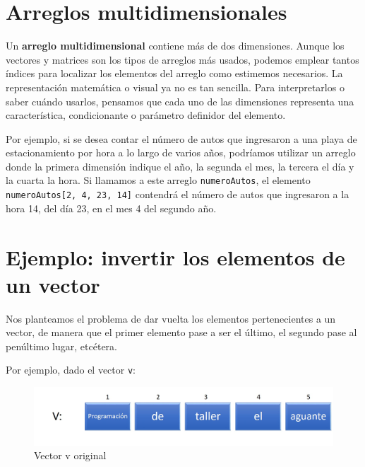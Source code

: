 \documentclass[
]{book}
\begin{document}
\hypertarget{arreglos-multidimensionales}{%
\section{Arreglos multidimensionales}\label{arreglos-multidimensionales}}

Un \textbf{arreglo multidimensional} contiene más de dos dimensiones. Aunque los vectores y matrices son los tipos de arreglos más usados, podemos emplear tantos índices para localizar los elementos del arreglo como estimemos necesarios. La representación matemática o visual ya no es tan sencilla. Para interpretarlos o saber cuándo usarlos, pensamos que cada uno de las dimensiones representa una característica, condicionante o parámetro definidor del elemento.

Por ejemplo, si se desea contar el número de autos que ingresaron a una playa de estacionamiento por hora a lo largo de varios años, podríamos utilizar un arreglo donde la primera dimensión indique el año, la segunda el mes, la tercera el día y la cuarta la hora. Si llamamos a este arreglo \texttt{numeroAutos}, el elemento \texttt{numeroAutos{[}2,\ 4,\ 23,\ 14{]}} contendrá el número de autos que ingresaron a la hora 14, del día 23, en el mes 4 del segundo año.

\hypertarget{ejemplo-invertir-los-elementos-de-un-vector}{%
\section{Ejemplo: invertir los elementos de un vector}\label{ejemplo-invertir-los-elementos-de-un-vector}}

Nos planteamos el problema de dar vuelta los elementos pertenecientes a un vector, de manera que el primer elemento pase a ser el último, el segundo pase al penúltimo lugar, etcétera.

Por ejemplo, dado el vector \texttt{v}:

\begin{figure}

{\centering \includegraphics[width=0.8\linewidth]{images/14_invertir1} 

}

\caption{Vector v original}\label{fig:inv1}
\end{figure}
\end{document}
